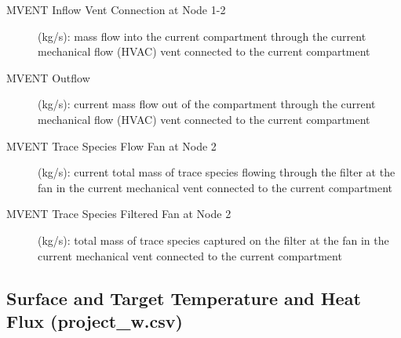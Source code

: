 \begin{description}
\item[MVENT Inflow Vent Connection at Node 1-2] (kg/s): mass flow into the current compartment through the current mechanical flow (HVAC) vent connected to the current compartment
\item[MVENT Outflow] (kg/s): current mass flow out of the compartment through the current mechanical flow (HVAC) vent connected to the current compartment
\item[MVENT Trace Species Flow Fan at Node 2] (kg/s): current total mass of trace species flowing through the filter at the fan in the current mechanical vent connected to the current compartment
\item[MVENT Trace Species Filtered Fan at Node 2] (kg/s): total mass of trace species captured on the filter at the fan in the current mechanical vent connected to the current compartment
\end{description}

\subsection{Surface and Target Temperature and Heat Flux (project\_w.csv)}

